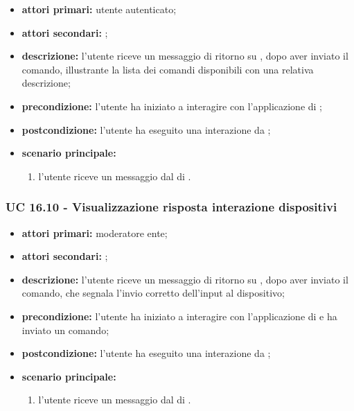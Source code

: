 	\begin{itemize}
			\item \textbf{attori primari:} utente autenticato;
			\item \textbf{attori secondari:} ;
			\item \textbf{descrizione:} l'utente riceve un messaggio di ritorno su , dopo aver inviato il comando, illustrante la lista dei comandi disponibili con una relativa descrizione;
			\item \textbf{precondizione:} l'utente ha iniziato a interagire con l'applicazione di ;
			\item \textbf{postcondizione:} l'utente ha eseguito una interazione da ;
			\item \textbf{scenario principale:}
			\begin{enumerate}
				\item l'utente riceve un messaggio dal  di .
			\end{enumerate}
		\end{itemize}


	\subsubsection{UC 16.10 - Visualizzazione risposta interazione dispositivi}

		\begin{itemize}
			\item \textbf{attori primari:} moderatore ente;
			\item \textbf{attori secondari:} ;
			\item \textbf{descrizione:} l'utente riceve un messaggio di ritorno su , dopo aver inviato il comando, che segnala l'invio corretto dell'input al dispositivo;
			\item \textbf{precondizione:} l'utente ha iniziato a interagire con l'applicazione di  e ha inviato un comando;
			\item \textbf{postcondizione:} l'utente ha eseguito una interazione da ;
			\item \textbf{scenario principale:}
			\begin{enumerate}
				\item l'utente riceve un messaggio dal  di .
			\end{enumerate}
		\end{itemize}
